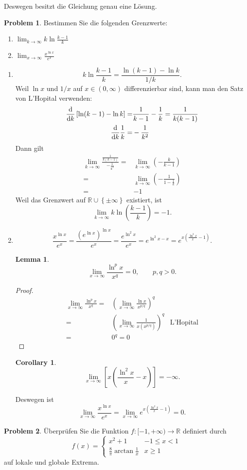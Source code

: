 \documentclass[prb,12pt]{revtex4-2}
\newtheorem{Lemma}[Theorem]{Lemma}
\newtheorem{Corollary}[Theorem]{Corollary}
\theoremstyle{definition}
\newtheorem{Problem}{Problem}
\theoremstyle{definition}
\newenvironment{parts}{\begin{enumerate}[label=(\alph*)]}{\end{enumerate}}
\newcommand{\R}{\mathbb{R}}
\begin{document}
Deswegen besitzt die Gleichung genau eine L\"{o}sung.

\begin{Problem}
	Bestimmen Sie die folgenden Grenzwerte:
	\begin{parts}
	\item $\lim_{k \to \infty} k\ln \frac{k-1}{k}$ 
	\item  $\lim_{x \to \infty} \frac{x^{\ln x}}{e^x}$
	\end{parts}
\end{Problem}

\begin{parts}
\item \[
k\ln \frac{k-1}{k}=\frac{\ln (k-1)-\ln k}{1 / k}
.\] 
Weil $\ln x$ und $1 / x$ auf $x\in (0,\infty)$ differenzierbar sind, kann man den Satz von L'Hopital verwenden:
\begin{align*}
	\dv{k}\left[ \ln(k-1)-\ln k \right] =& \frac{1}{k-1}-\frac{1}{k}=\frac{1}{k(k-1)}\\
	\dv{k}\frac{1}{k}=&-\frac{1}{k^2}
\end{align*}
Dann gilt
\begin{align*}
	\lim_{k \to \infty}  \frac{\frac{1}{k(k-1)}}{-\frac{1}{k^2}}=&\lim_{k \to \infty} \left( -\frac{k}{k-1} \right)\\
	=& \lim_{k \to \infty} \left( -\frac{1}{1-\frac{1}{k}} \right) \\
	=&-1
\end{align*}
Weil das Grenzwert auf $\R\cup \left\{ \pm\infty \right\} $ existiert, ist
\[
\lim_{k \to \infty} k\ln\left( \frac{k-1}{k} \right) =-1
.\]
\item \[
		\frac{x^{\ln x}}{e^x}=\frac{\left( e^{\ln x} \right)^{\ln x}}{e^x}=\frac{e^{\ln^2 x}}{e^x}=e^{\ln^2 x-x}=e^{x\left( \frac{\ln^2 x}{x}-1 \right) }
.\]
\begin{Lemma}
	\[
	\lim_{x \to \infty} \frac{\ln^p x}{x^q}=0,\qquad p,q>0
	.\] 
\end{Lemma}
\begin{proof}
	\begin{align*}
		\lim_{x \to \infty} \frac{\ln^p x}{x^q}=&\left( \lim_{x \to \infty} \frac{\ln x}{x^{p / q}} \right)^q\\
		=&\left( \lim_{x \to \infty} \frac{1}{x(x^{p / q})} \right)^q & \text{L'Hopital}\\
		=& 0^q=0
	\end{align*}
\end{proof}
\begin{Corollary}
	\[
	\lim_{x \to \infty} \left[ x\left( \frac{\ln^2x}{x}-x \right)  \right] =-\infty
	.\] 
\end{Corollary}
Deswegen ist
\[
	\lim_{x \to \infty} \frac{x^{\ln x}}{e^x}=\lim_{x \to \infty} e^{x\left( \frac{\ln^2 x}{x}-1 \right) }=0
.\] 
\end{parts}
\begin{Problem}
	Überprüfen Sie die Funktion $f : [-1, +\infty) \to \R$ definiert durch
	\[
	f(x)=\begin{cases}
		x^2+1 & -1\le x < 1\\
		\frac{8}{\pi}\arctan \frac{1}{x} & x \ge 1
	\end{cases}
	\]
auf lokale und globale Extrema.
\end{Problem}
\end{document}
